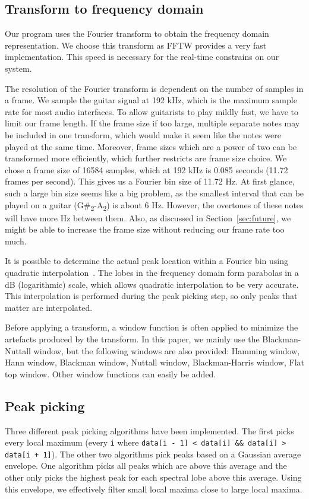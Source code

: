 \documentclass[10pt,twocolumn]{article}
\begin{document}
\subsection{Transform to frequency domain}
Our program uses the Fourier transform to obtain the frequency domain representation. We choose this transform as FFTW provides a very fast implementation. This speed is necessary for the real-time constrains on our system.

The resolution of the Fourier transform is dependent on the number of samples in a frame. We sample the guitar signal at 192 kHz, which is the maximum sample rate for most audio interfaces. To allow guitarists to play mildly fast, we have to limit our frame length. If the frame size if too large, multiple separate notes may be included in one transform, which would make it seem like the notes were played at the same time. Moreover, frame sizes which are a power of two can be transformed more efficiently, which further restricts are frame size choice. We chose a frame size of 16584 samples, which at 192 kHz is 0.085 seconds (11.72 frames per second). This gives us a Fourier bin size of 11.72 Hz. At first glance, such a large bin size seems like a big problem, as the smallest interval that can be played on a guitar (G\#\textsubscript{2}-A\textsubscript{2}) is about 6 Hz. However, the overtones of these notes will have more Hz between them. Also, as discussed in Section~\ref{sec:future}, we might be able to increase the frame size without reducing our frame rate too much.

It is possible to determine the actual peak location within a Fourier bin using quadratic interpolation~\cite{interpol2}. The lobes in the frequency domain form parabolas in a dB (logarithmic) scale, which allows quadratic interpolation to be very accurate. This interpolation is performed during the peak picking step, so only peaks that matter are interpolated.

Before applying a transform, a window function is often applied to minimize the artefacts produced by the transform. In this paper, we mainly use the Blackman-Nuttall window, but the following windows are also provided: Hamming window, Hann window, Blackman window, Nuttall window, Blackman-Harris window, Flat top window. Other window functions can easily be added.

\subsection{Peak picking}
Three different peak picking algorithms have been implemented. The first picks every local maximum (every \texttt{i} where \texttt{data[i - 1] < data[i] \&\& data[i] > data[i + 1]}). The other two algorithms pick peaks based on a Gaussian average envelope. One algorithm picks all peaks which are above this average and the other only picks the highest peak for each spectral lobe above this average. Using this envelope, we effectively filter small local maxima close to large local maxima.
\end{document}

